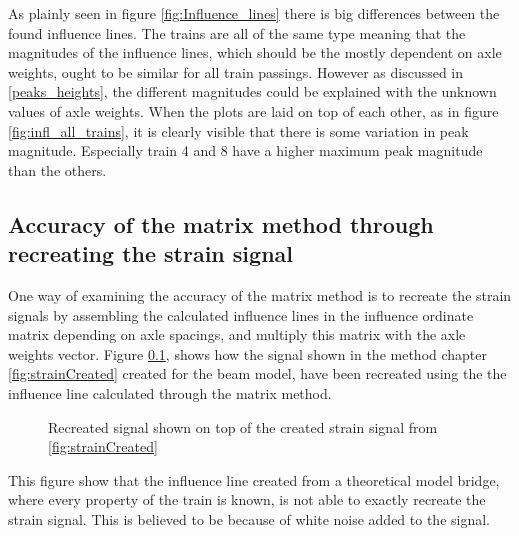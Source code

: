 As plainly seen in figure \ref{fig:Influence_lines} there is big differences between the found influence lines. The trains are all of the same type meaning that the magnitudes of the influence lines, which should be the mostly dependent on axle weights, ought to be similar for all train passings. However as discussed in \ref{peaks_heights}, the different magnitudes could be explained with the unknown values of axle weights. When the plots are laid on top of each other, as in figure \ref{fig:infl_all_trains}, it is clearly visible that there is some variation in peak magnitude. Especially train 4 and 8 have a higher maximum peak magnitude than the others.

\subsection{Accuracy of the matrix method through recreating the strain signal}
One way of examining the accuracy of the matrix method is to recreate the strain signals by assembling the calculated influence lines in the influence ordinate matrix depending on axle spacings, and multiply this matrix with the axle weights vector. Figure \ref{}, shows how the signal shown in the method chapter \ref{fig:strainCreated} created for the beam model, have been recreated using the the influence line calculated through the matrix method.
\begin{figure}[H]
	\begin{adjustbox}{center}
		
	\end{adjustbox}
	\caption{Recreated signal shown on top of the created strain signal from \ref{fig:strainCreated}}
\end{figure}
This figure show that the influence line created from a theoretical model bridge, where every property of the train is known, is not able to exactly recreate the strain signal. This is believed to be because of white noise added to the signal.

